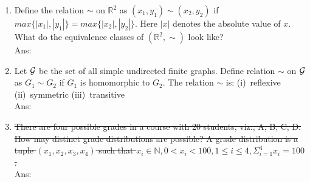 \documentclass[10pt, letterpaper]{article}
\newcommand{\eat}[1]{}
\begin{document}
\begin{enumerate}\item Define the relation $\sim$ on $\mathbb{R}^2$ as $(x_1, y_1) \sim (x_2, y_2)$ if $max\{|x_1|, |y_1|\} = max\{|x_2|,  |y_2|\}$. Here $|x|$ denotes the absolute value of $x$. What do the equivalence classes of $(\mathbb{R}^2, \sim)$ look like?\\
Ans:



\item Let $\cal{G}$ be the set of all simple undirected finite graphs. Define relation $\sim$ on $\cal{G}$ as $G_1 \sim G_2$ if $G_1$ is homomorphic to $G_2$. The relation $\sim$ is: (i)~reflexive (ii)~symmetric (iii)~transitive\\
Ans:



\item \sout{There are four possible grades in a course with 20 students, viz., A, B, C, D. How may distinct grade distributions are possible? A grade distribution is a tuple $(x_1, x_2, x_3, x_4)$ such that $x_i \in \mathbb{N}, 0 < x_i < 100 , 1 \leq i \leq 4, \Sigma_{i=1}^4 x_i = 100$.} \\
Ans:

\end{enumerate}
\end{document}
